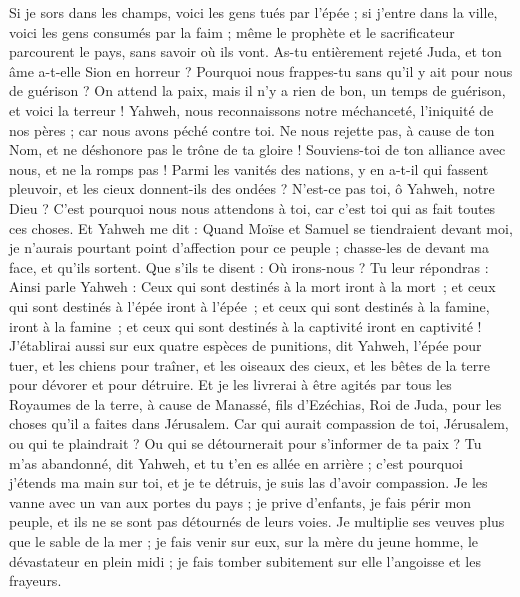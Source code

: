 \begin{multicols}{2}
Si je sors dans les champs, voici les gens tués par l'épée ; si j'entre dans la ville, voici les gens consumés par la faim ; même le prophète et le sacrificateur parcourent le pays, sans savoir où ils vont.
As-tu entièrement rejeté Juda, et ton âme a-t-elle Sion en horreur ? Pourquoi nous frappes-tu sans qu'il y ait pour nous de guérison ? On attend la paix, mais il n'y a rien de bon, un temps de guérison, et voici la terreur !
Yahweh, nous reconnaissons notre méchanceté, l'iniquité de nos pères ; car nous avons péché contre toi.
Ne nous rejette pas, à cause de ton Nom, et ne déshonore pas le trône de ta gloire ! Souviens-toi de ton alliance avec nous, et ne la romps pas !
Parmi les vanités des nations, y en a-t-il qui fassent pleuvoir, et les cieux donnent-ils des ondées ? N'est-ce pas toi, ô Yahweh, notre Dieu ? C'est pourquoi nous nous attendons à toi, car c'est toi qui as fait toutes ces choses.
\VerseOne{}Et Yahweh me dit : Quand Moïse et Samuel se tiendraient devant moi, je n'aurais pourtant point d'affection pour ce peuple ; chasse-les de devant ma face, et qu'ils sortent.
Que s'ils te disent : Où irons-nous ? Tu leur répondras : Ainsi parle Yahweh : Ceux qui sont destinés à la mort iront à la mort ; et ceux qui sont destinés à l’épée iront à l’épée ; et ceux qui sont destinés à la famine, iront à la famine ; et ceux qui sont destinés à la captivité iront en captivité !
J'établirai aussi sur eux quatre espèces de punitions, dit Yahweh, l'épée pour tuer, et les chiens pour traîner, et les oiseaux des cieux, et les bêtes de la terre pour dévorer et pour détruire. 
Et je les livrerai à être agités par tous les Royaumes de la terre, à cause de Manassé, fils d'Ezéchias, Roi de Juda, pour les choses qu'il a faites dans Jérusalem. 
Car qui aurait compassion de toi, Jérusalem, ou qui te plaindrait ? Ou qui se détournerait pour s'informer de ta paix ? 
Tu m'as abandonné, dit Yahweh, et tu t'en es allée en arrière ; c'est pourquoi j'étends ma main sur toi, et je te détruis, je suis las d'avoir compassion.
Je les vanne avec un van aux portes du pays ; je prive d'enfants, je fais périr mon peuple, et ils ne se sont pas détournés de leurs voies.
Je multiplie ses veuves plus que le sable de la mer ; je fais venir sur eux, sur la mère du jeune homme, le dévastateur en plein midi ; je fais tomber subitement sur elle l'angoisse et les frayeurs.

\end{multicols}
